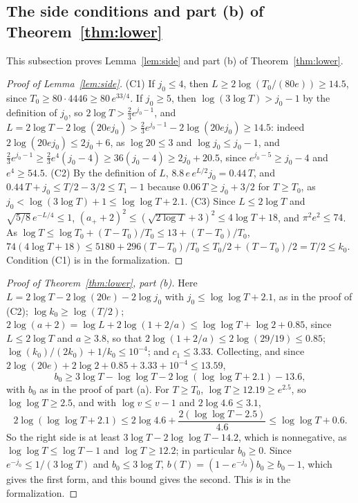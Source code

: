 \documentclass[12pt]{amsart}
\theoremstyle{definition}
\numberwithin{equation}{section}
\begin{document}
\subsection{The side conditions and part (b) of Theorem~\ref{thm:lower}}
This subsection proves Lemma~\ref{lem:side} and part (b) of Theorem~\ref{thm:lower}.

\begin{proof}[Proof of Lemma~\ref{lem:side}]
(C1) If $j_0\le4$, then $L\ge2\log(T_0/(80e))\ge14.5$, since $T_0\ge80\cdot4446\ge80\,e^{33/4}$. If $j_0\ge5$, then $\log(3\log T)>j_0-1$ by the definition of $j_0$, so $2\log T>\frac23e^{j_0-1}$, and $L=2\log T-2\log(20ej_0)>\frac23e^{j_0-1}-2\log(20ej_0)\ge14.5$: indeed $2\log(20ej_0)\le2j_0+6$, as $\log20\le3$ and $\log j_0\le j_0-1$, and $\frac23e^{j_0-1}\ge\frac23e^4(j_0-4)\ge36(j_0-4)\ge2j_0+20.5$, since $e^{j_0-5}\ge j_0-4$ and $e^4\ge54.5$. (C2) By the definition of $L$, $8.8\,e\,e^{L/2}j_0=0.44\,T$, and $0.44\,T+j_0\le T/2-3/2\le T_1-1$ because $0.06\,T\ge j_0+3/2$ for $T\ge T_0$, as $j_0<\log(3\log T)+1\le\log\log T+2.1$. (C3) Since $L\le2\log T$ and $\sqrt{5/8}\,e^{-L/4}\le1$, $(a_++2)^2\le(\sqrt{2\log T}+3)^2\le4\log T+18$, and $\pi^2e^2\le74$. As $\log T\le\log T_0+(T-T_0)/T_0\le13+(T-T_0)/T_0$, $74(4\log T+18)\le5180+296(T-T_0)/T_0\le T_0/2+(T-T_0)/2=T/2\le k_0$. Condition (C1) is  in the formalization.
\end{proof}

\begin{proof}[Proof of Theorem~\ref{thm:lower}, part (b)]
Here $L=2\log T-2\log(20e)-2\log j_0$ with $j_0\le\log\log T+2.1$, as in the proof of (C2); $\log k_0\ge\log(T/2)$; $2\log(a+2)=\log L+2\log(1+2/a)\le\log\log T+\log2+0.85$, since $L\le2\log T$ and $a\ge3.8$, so that $2\log(1+2/a)\le2\log(29/19)\le0.85$; $\log(k_0)/(2k_0)+1/k_0\le10^{-4}$; and $c_1\le3.33$. Collecting, and since $2\log(20e)+2\log2+0.85+3.33+10^{-4}\le13.59$,
\[
b_0\ge3\log T-\log\log T-2\log(\log\log T+2.1)-13.6 ,
\]
with $b_0$ as in the proof of part (a). For $T\ge T_0$, $\log T\ge12.19\ge e^{2.5}$, so $\log\log T\ge2.5$, and with $\log v\le v-1$ and $2\log4.6\le3.1$,
\[
2\log(\log\log T+2.1)\le2\log4.6+\frac{2(\log\log T-2.5)}{4.6}\le\log\log T+0.6 .
\]
So the right side is at least $3\log T-2\log\log T-14.2$, which is nonnegative, as $\log\log T\le\log T-1$ and $\log T\ge12.2$; in particular $b_0\ge0$. Since $e^{-j_0}\le1/(3\log T)$ and $b_0\le3\log T$, $b(T)=(1-e^{-j_0})b_0\ge b_0-1$, which gives the first form, and this bound gives the second. This is  in the formalization.
\end{proof}
\end{document}
